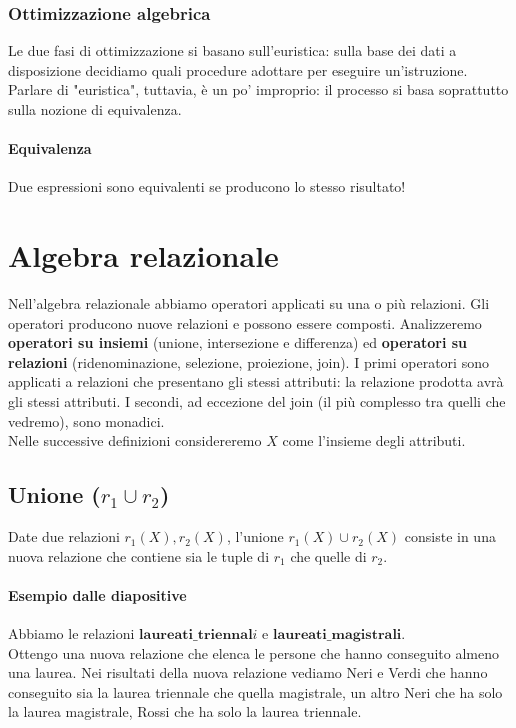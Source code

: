 \subsubsection{Ottimizzazione algebrica}
Le due fasi di ottimizzazione si basano sull'euristica: sulla base dei dati a disposizione decidiamo quali procedure adottare per eseguire un'istruzione. Parlare di "euristica", tuttavia, è un po' improprio: il processo si basa soprattutto sulla nozione di equivalenza.
\paragraph{Equivalenza} Due espressioni sono equivalenti se producono lo stesso risultato!
\pagebreak

\section{Algebra relazionale}
Nell'algebra relazionale abbiamo operatori applicati su una o più relazioni. Gli operatori producono nuove relazioni e possono essere composti. Analizzeremo \textbf{operatori su insiemi} (unione, intersezione e differenza) ed \textbf{operatori su relazioni} (ridenominazione, selezione, proiezione, join). I primi operatori sono applicati a relazioni che presentano gli stessi attributi: la relazione prodotta avrà gli stessi attributi. I secondi, ad eccezione del join (il più complesso tra quelli che vedremo), sono monadici.\\

\noindent Nelle successive definizioni considereremo $X$ come l'insieme degli attributi.
\subsection{Unione ($r_1 \cup r_2$)}
Date due relazioni $r_1(X), r_2(X)$, l'unione $r_1(X) \cup r_2(X)$ consiste in una nuova relazione che contiene sia le tuple di $r_1$ che quelle di $r_2$.
\paragraph{Esempio dalle diapositive} Abbiamo le relazioni $\mathbf{laureati\_triennal}i$ e $\mathbf{laureati\_magistrali}$.\\
Ottengo una nuova relazione che elenca le persone che hanno conseguito almeno una laurea. Nei risultati della nuova relazione vediamo Neri e Verdi che hanno conseguito sia la laurea triennale che quella magistrale, un altro Neri che ha solo la laurea magistrale, Rossi che ha solo la laurea triennale.

